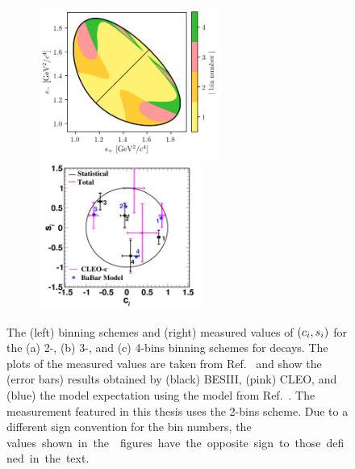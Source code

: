 \begin{figure}[p]
\begin{subfigure}{\columnwidth}
        \caption{}
        \label{fig:kskk_bins_3}
    \end{subfigure}
    \begin{subfigure}{\columnwidth}
        \centering
        \includegraphics[height=5cm,valign=t]{figures/theory/binnings/KsKK_4bins.png}
        \includegraphics[height=4.8cm,valign=t]{figures/theory/bes_kskk_4bins.png}
        \caption{}
        \label{fig:kskk_bins_4}
    \end{subfigure}
    \caption{The (left) binning schemes and (right) measured values of $(c_i,s_i)$ for the (a) 2-, (b) 3-, and (c) 4-bins binning schemes for \DtoKsKK decays. The plots of the measured values are taken from Ref.~\cite{BESCISIKSKK} and show the (error bars) results obtained by (black) BESIII, (pink) CLEO, and (blue) the model expectation using the model from Ref.~\cite{BABAR2010}.
    The measurement featured in this thesis uses the 2-bins scheme. Due to a different sign convention for the bin numbers, the \si values shown in the \besiii figures have the opposite sign to those defined in the text.}
    \label{fig:kskk_bins}
\end{figure}




